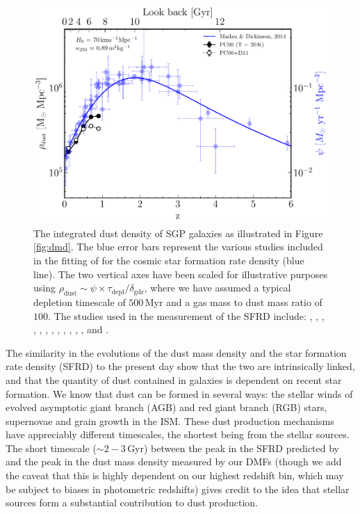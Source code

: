 \begin{figure}
	\centering
	\includegraphics[width=0.8\columnwidth]{Figures/Figure_3_9.pdf}
	\caption[Comparison of dust mass density and the cosmic star formation rate density]{The integrated dust density of SGP galaxies as illustrated in Figure \ref{fig:dmd}. The blue error bars represent the various studies included in the fitting of \citealt{Madau_2014} for the cosmic star formation rate density (blue line). The two vertical axes have been scaled for illustrative purposes using $\rho_{\textrm{dust}} \sim \psi \times\tau_{\textrm{depl}}/\delta_{\textrm{gdr}}$, where we have assumed a typical depletion timescale of $500\,$Myr and a gas mass to dust mass ratio of $100$. The studies used in the measurement of the SFRD include: \citealt{Sanders_2003}, \citealt{Takeuchi_2003}, \citealt{Wyder_2005}, \citealt{Schiminovich_2005}, \citealt{Reddy_2009}, \citealt{Robotham_2011}, \citealt{Magnelli_2011}, \citealt{Cucciati_2012}, \citealt{Bouwens_2012b}, \citealt{Bouwens_2012a}, \citealt{Schenker_2013}, \citealt{Magnelli_2013}, \citealt{Gruppioni_2013} and \citealt{Dahlen_2007}.}
    \label{fig:sfrd}
\end{figure}

The similarity in the evolutions of the dust mass density and the star formation rate density (SFRD) to the present day show that the two are intrinsically linked, and that the quantity of dust contained in galaxies is dependent on recent star formation. We know that dust can be formed in several ways: the stellar winds of evolved asymptotic giant branch (AGB) and red giant branch (RGB) stars, supernovae and grain growth in the ISM. These dust production mechanisms have appreciably different timescales, the shortest being from the stellar sources. The short timescale ($\sim 2 - 3\,$Gyr) between the peak in the SFRD predicted by \citealt{Madau_2014} and the peak in the dust mass density measured by our DMFs (though we add the caveat that this is highly dependent on our highest redshift bin, which may be subject to biases in photometric redshifts) gives credit to the idea that stellar sources form a substantial contribution to dust production. 

